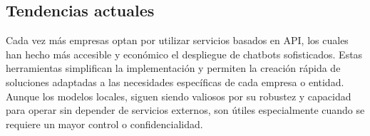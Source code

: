 \subsection{Tendencias actuales}
Cada vez más empresas optan por utilizar servicios basados en API, los cuales han hecho más accesible y económico el despliegue de chatbots sofisticados. Estas herramientas simplifican la implementación y permiten la creación rápida de soluciones adaptadas a las necesidades específicas de cada empresa o entidad. Aunque los modelos locales, siguen siendo valiosos por su robustez y capacidad para operar sin depender de servicios externos, son útiles especialmente cuando se requiere un mayor control o confidencialidad.








